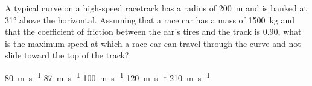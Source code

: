 \documentclass{../../oss-classkick-exam}
\begin{document}
\begin{multicols*}{2}
\begin{questions}
%
%
%
%     


    \question A typical curve on a high-speed racetrack has a radius of
    \SI{200}{\metre} and is banked at \ang{31} above the horizontal. Assuming
    that a race car has a mass of \SI{1500}{\kilo\gram} and that the
    coefficient of friction between the car's tires and the track is 0.90, what
    is the maximum speed at which a race car can travel through the curve and
    not slide toward the top of the track?
    \begin{choices}
      \choice\SI{80}{\metre\per\second}
      \choice\SI{87}{\metre\per\second}
      \choice\SI{100}{\metre\per\second}
      \choice\SI{120}{\metre\per\second}
      \choice\SI{210}{\metre\per\second}
    \end{choices}
    
    

\end{questions}
\end{multicols*}
\end{document}
